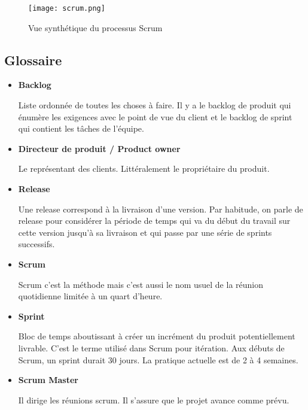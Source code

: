 \begin{figure}[H]
  \begin{center}
    \texttt{[image: scrum.png]}  
  \end{center}
  \caption{Vue synthétique du processus Scrum}  
  \label{scrumsynthese}
\end{figure}

\newpage
\subsection{Glossaire}

\begin{itemize}
\item[]\textbf{Backlog}

  Liste ordonnée de toutes les choses à faire. Il y a le backlog de produit qui
  énumère les exigences avec le point de vue du client et le backlog de sprint qui
  contient les tâches de l'équipe. \\

\item[]\textbf{Directeur de produit / Product owner}

  Le représentant des clients. Littéralement le propriétaire du produit.\\

\item[]\textbf{Release}

  Une release correspond à la livraison d'une version. Par habitude, on parle de
  release pour considérer la période de temps qui va du début du travail sur cette
  version jusqu'à sa livraison et qui passe par une série de sprints
  successifs. \\

\item[]\textbf{Scrum}

  Scrum c'est la méthode mais c'est aussi le nom usuel de la réunion quotidienne
  limitée à un quart d'heure. \\

\item[]\textbf{Sprint}

  Bloc de temps aboutissant à créer un incrément du produit potentiellement
  livrable. C'est le terme utilisé dans Scrum pour itération. Aux débuts de Scrum,
  un sprint durait 30 jours. La pratique actuelle est de 2 à 4 semaines.\\

\item[]\textbf{Scrum Master}

  Il dirige les réunions scrum. Il s'assure que le projet avance comme prévu.\\
\end{itemize}



